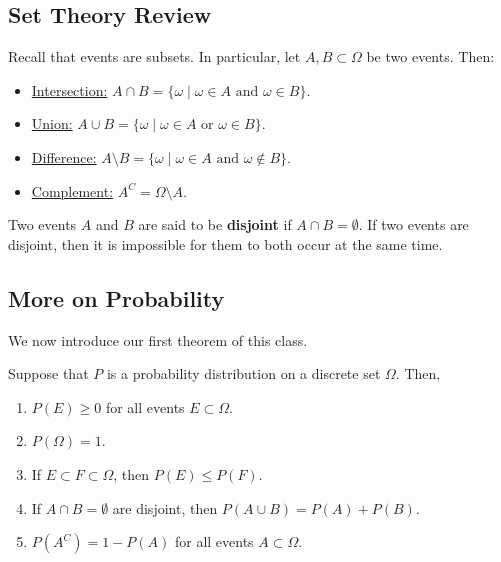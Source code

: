 \documentclass[letterpaper]{article}
\begin{document}
\subsection{Set Theory Review}
Recall that events are subsets. In particular, let $A, B \subset \Omega$ be two events. Then: 
\begin{itemize}
    \item \underline{Intersection:} $A \cap B = \{\omega \mid \omega \in A \text{ and } \omega \in B\}$. 
    \item \underline{Union:} $A \cup B = \{\omega \mid \omega \in A \text{ or } \omega \in B\}$.
    \item \underline{Difference:} $A \setminus B = \{\omega \mid \omega \in A \text{ and } \omega \notin B\}$.
    \item \underline{Complement:} $A^C = \Omega \setminus A$. 
\end{itemize}
Two events $A$ and $B$ are said to be \textbf{disjoint} if $A \cap B = \emptyset$. If two events are disjoint, then it is impossible for them to both occur at the same time. 

\subsection{More on Probability}
We now introduce our first theorem of this class. 
\begin{theorem}{}{}
    Suppose that $P$ is a probability distribution on a discrete set $\Omega$. Then,
    \begin{enumerate}
        \item $P(E) \geq 0$ for all events $E \subset \Omega$. 
        \item $P(\Omega) = 1$. 
        \item If $E \subset F \subset \Omega$, then $P(E) \leq P(F)$. 
        \item If $A \cap B = \emptyset$ are disjoint, then $P(A \cup B) = P(A) + P(B)$.
        \item $P(A^C) = 1 - P(A)$ for all events $A \subset \Omega$. 
    \end{enumerate}
\end{theorem}
\end{document}
